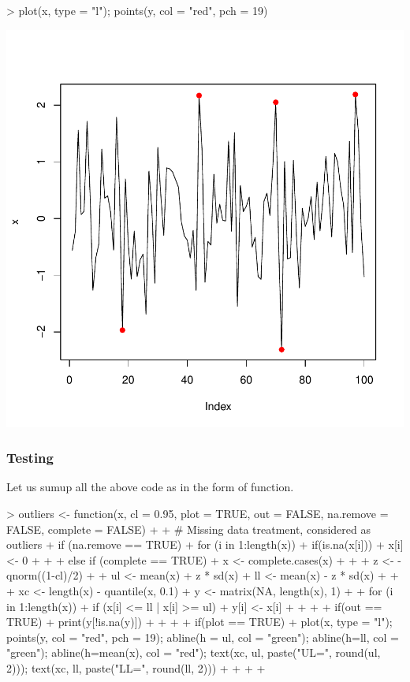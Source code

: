 \documentclass{article}
\begin{document}
\begin{Schunk}
\begin{Sinput}
> plot(x, type = "l"); points(y, col = "red", pch = 19)
\end{Sinput}
\end{Schunk}
\includegraphics{anadetect-004}

\subsubsection{Testing}

Let us sumup all the above code as in the form of function. 


\begin{leftbar}
\begin{Schunk}
\begin{Sinput}
> outliers <- function(x, cl = 0.95, plot = TRUE, out = FALSE, na.remove = FALSE, complete = FALSE){
+   
+   # Missing data treatment, considered as outliers
+   if (na.remove == TRUE){
+     for (i in 1:length(x)){
+       if(is.na(x[i])){
+         x[i] <- 0
+       }
+     }
+   } else if (complete == TRUE){
+     x <- complete.cases(x)
+   }
+   
+   z <- -qnorm((1-cl)/2)
+   
+   ul <- mean(x) + z * sd(x)
+   ll <- mean(x) - z * sd(x)
+   
+   
+   xc <- length(x) - quantile(x, 0.1) 
+   y <- matrix(NA, length(x), 1)
+   
+   for (i in 1:length(x)){
+     if (x[i] <= ll | x[i] >= ul){
+       y[i] <- x[i]
+     }
+   }
+   
+   if(out == TRUE){
+     print(y[!is.na(y)])  
+   }
+   
+   
+   if(plot == TRUE){
+     plot(x, type = "l"); points(y, col = "red", pch = 19); abline(h = ul, col = "green"); abline(h=ll, col = "green"); abline(h=mean(x), col = "red"); text(xc, ul, paste("UL=", round(ul, 2))); text(xc, ll, paste("LL=", round(ll, 2)))
+     
+   }  
+   
+ }
\end{Sinput}
\end{Schunk}
\end{leftbar} 
\end{document}
